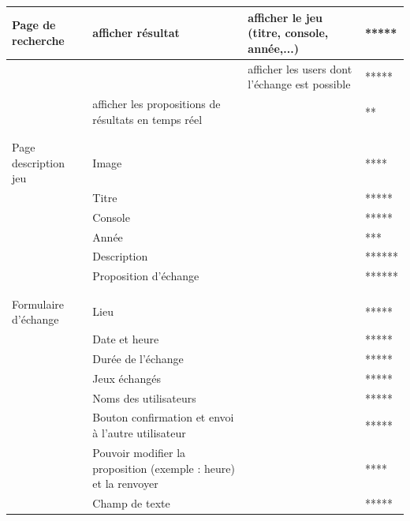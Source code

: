 \documentclass[a4paper,12pt,abstracton,titlepage]{scrartcl}
\begin{document}
\begin{longtable}{|p{}|p{}|p{}|l|}
 \hline
Page de recherche & afficher résultat & afficher le jeu (titre, console, année,...) & *****\\
\hline
 &  & afficher les users dont l'échange est possible & *****\\
 \hline
 & afficher les propositions de résultats en temps réel &  & **\\
 \hline
 & & & \\
 \hline
 & & & \\
 \hline
Page description jeu & Image &  & ****\\
 \hline
 & Titre &  & *****\\
 \hline
 & Console &  & *****\\
 \hline
 & Année &  & ***\\
 \hline
 & Description &  & ******\\
 \hline
 & Proposition d'échange &  & ******\\
 \hline
 & & & \\
 \hline
 & & & \\
 \hline
Formulaire d'échange & Lieu &  & *****\\
\hline
 & Date et heure &  & *****\\
 \hline
 & Durée de l'échange &  & *****\\
 \hline
 & Jeux échangés &  & *****\\
 \hline
 & Noms des utilisateurs &  & *****\\
 \hline
 & Bouton confirmation et envoi à l'autre utilisateur &  & *****\\
 \hline
 & Pouvoir modifier la proposition (exemple : heure) et la renvoyer &  & ****\\
 \hline
 & Champ de texte &  & *****\\
  \hline
\end{longtable}
\end{document}
